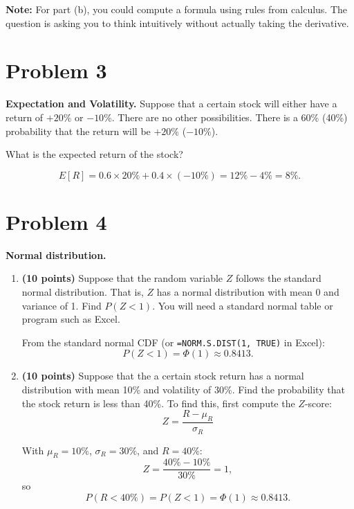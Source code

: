 \documentclass[11pt]{article}
\begin{document}
\noindent\textbf{Note:} For part (b), you could compute a formula using
rules from calculus. The question is asking you to think intuitively
without actually taking the derivative.

\section*{Problem 3}

\textbf{Expectation and Volatility.} Suppose that a certain stock will
either have a return of $+20\%$ or $-10\%$. There are no other
possibilities. There is a 60\% (40\%) probability that the return will be
$+20\%$ ($-10\%$).

What is the expected return of the stock?

\begin{solution}
\begin{equation*}
  E[R] = 0.6 \times 20\% + 0.4 \times (-10\%) = 12\% - 4\% = \boxed{8\%}.
\end{equation*}
\end{solution}

\section*{Problem 4}

\textbf{Normal distribution.}

\begin{enumerate}
  \item[(a)] \textbf{(10 points)} Suppose that the random variable $Z$
  follows the standard normal distribution. That is, $Z$ has a normal
  distribution with mean 0 and variance of 1. Find $P(Z < 1)$. You will
  need a standard normal table or program such as Excel.
  \begin{solution}
  From the standard normal CDF (or \texttt{=NORM.S.DIST(1, TRUE)} in
  Excel):
  \begin{equation*}
    P(Z < 1) = \Phi(1) \approx \boxed{0.8413}.
  \end{equation*}
  \end{solution}

  \item[(b)] \textbf{(10 points)} Suppose that the a certain stock return
  has a normal distribution with mean 10\% and volatility of 30\%. Find
  the probability that the stock return is less than 40\%. To find this,
  first compute the $Z$-score:
  \begin{equation*}
    Z = \frac{R - \mu_R}{\sigma_R}
  \end{equation*}
  \begin{solution}
  With $\mu_R = 10\%$, $\sigma_R = 30\%$, and $R = 40\%$:
  \begin{equation*}
    Z = \frac{40\% - 10\%}{30\%} = 1,
  \end{equation*}
  so
  \begin{equation*}
    P(R < 40\%) = P(Z < 1) = \Phi(1) \approx \boxed{0.8413}.
  \end{equation*}
  \end{solution}
\end{enumerate}
\end{document}
